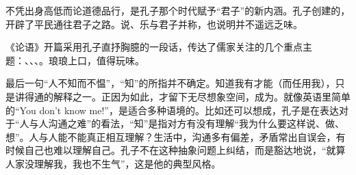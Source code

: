 {%

不凭出身高低而论道德品行，是孔子那个时代赋予“君子”的新内涵。孔子创建的，开辟了平民通往君子之路。说、乐与君子并称，也说明并不遥远乏味。
}
{
《论语》开篇采用孔子直抒胸臆的一段话，传达了儒家关注的几个重点主题：、、、。琅琅上口，值得玩味。

最后一句“人不知而不愠”，“知”的所指并不确定。知道我有才能（而任用我），只是讲得通的解释之一。正因为如此，才留下无尽想象空间，成为。就像英语里简单的“You don't know me!”，是适合多种语境的。比如还可以想成，孔子是在表达对于“人与人沟通之难”的看法，“知”是指对方有没有理解“我为什么要这样说、做、想”。人与人能不能真正相互理解？生活中，沟通多有偏差，矛盾常出自误会，有时候自己也难以理解自己。孔子不在这种抽象问题上纠结，而是豁达地说，“就算人家没理解我，我也不生气”，这是他的典型风格。
}

